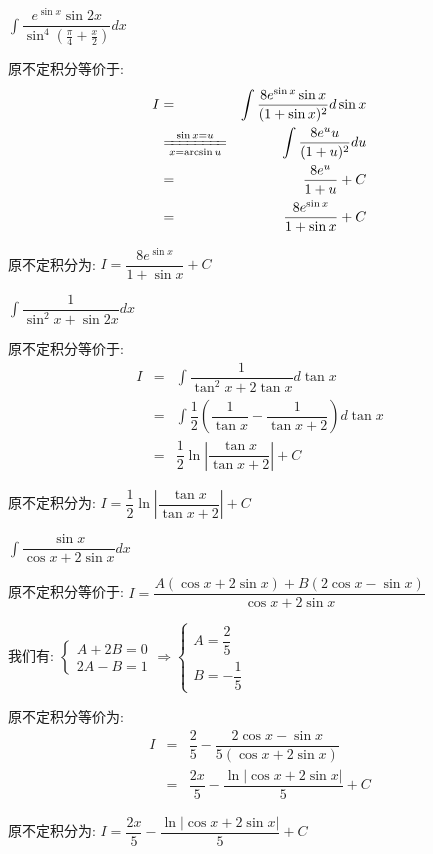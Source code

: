 \begin{proposition}
	$\int \dfrac{e^{\sin x}\sin 2x}{\sin^4(\frac{\pi}{4}+\frac{x}{2})}dx$
\end{proposition}
\begin{solution}
		
	原不定积分等价于:  
	\begin{eqnarray*}
		I&=&\int \dfrac{8e^{\sin x}\sin x}{(1+\sin x)^2}d\sin x\\
		&\xlongequal[x=\arcsin u]{\sin x=u}&\int\dfrac{8e^{u}u}{(1+u)^2}du\\
		&=&\dfrac{8e^u}{1+u}+C \\
		&=&\dfrac{8e^{\sin x}}{1+\sin x}+C
	\end{eqnarray*}
	
	原不定积分为:  $I=\dfrac{8e^{\sin x}}{1+\sin x}+C$
\end{solution}
\begin{proposition}
	$\int \dfrac{1}{\sin^2x+\sin 2x}dx$
\end{proposition}
\begin{solution}
		
	原不定积分等价于:  
	\begin{eqnarray*}
		I&=&\int \dfrac{1}{\tan^2 x+2\tan x}d\tan x\\
		&=&\int\dfrac{1}{2}\left(\dfrac{1}{\tan x}-\dfrac{1}{\tan x+2}\right)d\tan x\\
		&=&\dfrac{1}{2}\ln |\dfrac{\tan x}{\tan x+2}|+C 
	\end{eqnarray*}

原不定积分为:  $I=\dfrac{1}{2}\ln |\dfrac{\tan x}{\tan x+2}|+C $
\end{solution}

\begin{proposition}
	$\int \dfrac{\sin x}{\cos x+2\sin x}dx$
\end{proposition}
\begin{solution}
		
	原不定积分等价于:  $I=\dfrac{A(\cos x+2\sin x)+B(2\cos x-\sin x)}{\cos x+2\sin x}$
	
	我们有:  $\left\lbrace
	\begin{array}{l}
		A+2B=0\\
		2A-B=1
	\end{array}
	\right. \Rightarrow \left\lbrace
	\begin{array}{l}
		A=\dfrac{2}{5}\\
		B=-\dfrac{1}{5}
	\end{array}
	\right. $
	
	原不定积分等价为:  
	\begin{eqnarray*}
		I&=&\dfrac{2}{5}-\dfrac{2\cos x-\sin x}{5(\cos x+2\sin x)}\\
		&=&\dfrac{2x}{5}-\dfrac{\ln |\cos x+2\sin x|}{5}+C
	\end{eqnarray*}

原不定积分为:  $I=\dfrac{2x}{5}-\dfrac{\ln |\cos x+2\sin x|}{5}+C$
\end{solution}

